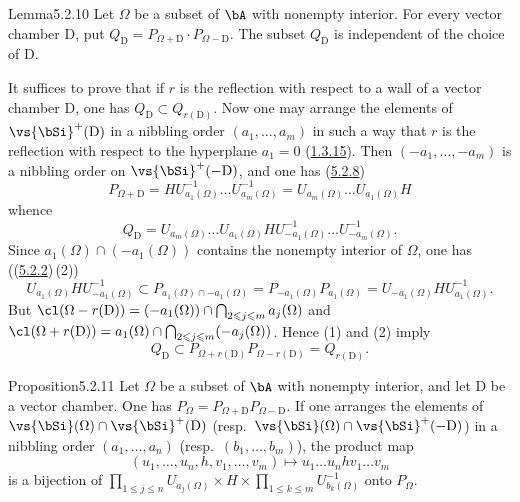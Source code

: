 \documentclass[12pt,a4paper,oneside,english]{smfart}
\makeatletter
\newcommand{\btanchor}[1]{\leavevmode\Hy@raisedlink{\hypertarget{bt:#1}{}}}
\newcommand{\btpageanchor}[1]{\Hy@raisedlink{\hypertarget{p:#1}{}}}
\newcommand{\btref}[1]{\hyperlink{bt:#1}{#1}}
\newcommand{\btpage}[1]{\marginnote{p.~#1}\btpageanchor{#1}}
\newcommand{\pg}[1]{\btpage{#1}}
\theoremstyle{definition}
\theoremstyle{bt}
\makeatother
\begin{document}
\begin{btstat}{Lemma}{5.2.10}\btanchor{5.2.10}
Let $\Omega$ be a subset of $\bA$ with nonempty interior. For every vector
chamber $\mathrm{D}$, put
$Q_{\mathrm{D}}=P_{\Omega+\mathrm{D}}\cdot P_{\Omega-\mathrm{D}}$. The subset
$Q_{\mathrm{D}}$ is independent of the choice of $\mathrm{D}$.
\end{btstat}

\pg{100}
It suffices to prove that if $r$ is the reflection with respect to a wall of a
vector chamber $\mathrm{D}$, one has
$Q_{\mathrm{D}}\subset Q_{r(\mathrm{D})}$. Now one may arrange the elements of
$\vs{\bSi}^{+}(\mathrm{D})$ in a nibbling order $(a_{1},\dots,a_{m})$ in such a
way that $r$ is the reflection with respect to the hyperplane $a_{1}=0$
(\btref{1.3.15}). Then $(-a_{1},\dots,-a_{m})$ is a nibbling order on
$\vs{\bSi}^{+}(-\mathrm{D})$, and one has (\btref{5.2.8})
\[
P_{\Omega+\mathrm{D}}=HU^{-1}_{a_{1}(\Omega)}\dots U^{-1}_{a_{m}(\Omega)} =U_{a_{m}(\Omega)}\dots U_{a_{1}(\Omega)}H
\]
whence
\begin{equation*}
Q_{\mathrm{D}}=U_{a_{m}(\Omega)}\dots U_{a_{1}(\Omega)}
HU^{-1}_{-a_{1}(\Omega)}\dots U^{-1}_{-a_{m}(\Omega)}.\tag{1}
\end{equation*}
Since $a_{1}(\Omega)\cap(-a_{1}(\Omega))$ contains the nonempty interior of
$\Omega$, one has ((\btref{5.2.2})\,(2))
\begin{equation*}
U_{a_{1}(\Omega)}HU^{-1}_{-a_{1}(\Omega)}
\subset P_{a_{1}(\Omega)\cap-a_{1}(\Omega)}
=P_{-a_{1}(\Omega)}P_{a_{1}(\Omega)}
=U_{-a_{1}(\Omega)}HU^{-1}_{a_{1}(\Omega)}.\tag{2}
\end{equation*}
But $\cl(\Omega-r(\mathrm{D}))=(-a_{1}(\Omega))\cap
\bigcap_{2\leqslant j\leqslant m}a_{j}(\Omega)$ and
$\cl(\Omega+r(\mathrm{D}))=a_{1}(\Omega)\cap
\bigcap_{2\leqslant j\leqslant m}(-a_{j}(\Omega))$. Hence (1) and (2) imply
\[
Q_{\mathrm{D}}\subset P_{\Omega+r(\mathrm{D})}P_{\Omega-r(\mathrm{D})} =Q_{r(\mathrm{D})}.
\]

\begin{btstat}{Proposition}{5.2.11}\btanchor{5.2.11}
Let $\Omega$ be a subset of $\bA$ with nonempty interior, and let $\mathrm{D}$
be a vector chamber. One has
$P_{\Omega}=P_{\Omega+\mathrm{D}}P_{\Omega-\mathrm{D}}$. If one arranges the
elements of $\vs{\bSi}(\Omega)\cap\vs{\bSi}^{+}(\mathrm{D})$ (resp.\
$\vs{\bSi}(\Omega)\cap\vs{\bSi}^{+}(-\mathrm{D})$) in a nibbling order
$(a_{1},\dots,a_{n})$ (resp.\ $(b_{1},\dots,b_{m})$), the product map
\[
(u_{1},\dots,u_{n},h,v_{1},\dots,v_{m})\mapsto u_{1}\dots u_{n}hv_{1}\dots v_{m}
\]
is a bijection of $\prod_{1\leqslant j\leqslant n}U_{a_{j}(\Omega)}\times H
\times\prod_{1\leqslant k\leqslant m}U^{-1}_{b_{k}(\Omega)}$ onto $P_{\Omega}$.
\end{btstat}
\end{document}
